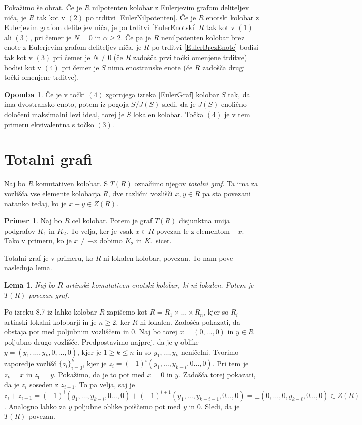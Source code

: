 \documentclass[a4paper, 12pt]{amsart}
\theoremstyle{definition} %
\newtheorem{primer}[definicija]{Primer}
\newtheorem{opomba}[definicija]{Opomba}
\theoremstyle{plain} %
\newtheorem{lema}[definicija]{Lema}
\begin{document}
Pokažimo še obrat. 
Če je $R$ nilpotenten kolobar z Eulerjevim grafom deliteljev niča, je $R$ tak kot v $(2)$ po trditvi \ref{EulerNilpotenten}. Če je $R$ enotski kolobar z Eulerjevim grafom deliteljev niča, je po trditvi \ref{EulerEnotski} $R$ tak kot v $(1)$ ali $(3)$, pri čemer je $N=0$ in $\alpha \ge 2$. Če pa je $R$ nenilpotenten kolobar brez enote z Eulerjevim grafom deliteljev niča, je $R$ po trditvi \ref{EulerBrezEnote} bodisi tak kot v $(3)$ pri čemer je $N\neq 0$ (če $R$ zadošča prvi točki omenjene trditve) bodisi kot v $(4)$ pri čemer je $S$ nima enostranske enote (če $R$ zadošča drugi točki omenjene trditve). 

\endproof

\begin{opomba}
Če je v točki $(4)$ zgornjega izreka \ref{EulerGraf} kolobar $S$ tak, da ima dvostransko enoto, potem iz pogoja $S/J(S)$ sledi, da je $J(S)$ enolično določeni maksimalni levi ideal, torej je $S$ lokalen kolobar. Točka $(4)$  je v tem primeru ekvivalentna s točko $(3)$.
\end{opomba}

\section{Totalni grafi}

Naj bo $R$ komutativen kolobar. S $T(R)$ označimo njegov \emph{totalni graf}. Ta ima za vozlišča vse elemente kolobarja $R$, dve različni vozlišči $x,y\in R$ pa sta povezani natanko tedaj, ko je $x+y\in Z(R)$.

\begin{primer}
Naj bo $R$ cel kolobar. Potem je graf $T(R)$ disjunktna unija podgrafov $K_1$ in $K_2$. To velja, ker je vsak $x\in R$ povezan le z elementom $-x$. Tako v primeru, ko je $x\neq -x$  dobimo $K_2$ in $K_1$ sicer. 
\end{primer}

Totalni graf je v primeru, ko $R$ ni lokalen kolobar, povezan. To nam pove naslednja lema.
\begin{lema}
Naj bo $R$ artinski komutativen enotski kolobar, ki ni lokalen. Potem je $T(R)$ povezan graf.
\end{lema}

\proof
Po izreku 8.7 iz \cite{Atiyah} lahko kolobar $R$ zapišemo kot $R=R_1 \times \dots \times R_n$, kjer so $R_i$ artinski lokalni kolobarji in je $n\ge 2$, ker $R$ ni lokalen. Zadošča pokazati, da obstaja pot med poljubnim vozliščem in 0. Naj bo torej $x=(0,\dots,0)$ in $y\in R$ poljubno drugo vozlišče. Predpostavimo najprej, da je $y$ oblike $y=(y_1,\dots,y_k,0,\dots,0)$, kjer je $1\ge k \le n$ in so $y_1,\dots,y_k$ neničelni. Tvorimo zaporedje vozlišč $\{z_i\}_{i=0}^k$, kjer je $z_i = (-1)^i (y_1,\dots, y_{k-i},0\dots,0)$. Pri tem je $z_k = x $ in $z_0 = y$. Pokažimo, da je to pot med $x=0 $ in $y$. Zadošča torej pokazati, da je $z_i $ soseden z $z_{i+1}$. To pa velja, saj je $z_i + z_{i+1} =  (-1)^i (y_1,\dots, y_{k-i},0\dots,0) +  (-1)^{i+1} (y_1,\dots, y_{k-i-1},0\dots,0) = \pm  (0,\dots,0, y_{k-i},0\dots,0)\in Z(R)$. Analogno lahko za $y$ poljubne oblike poiščemo pot med $y$ in $0$. Sledi, da je $T(R)$ povezan.
\end{document}

